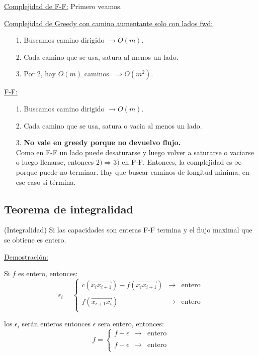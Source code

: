 \documentclass[12pt,a4paper]{article}
\begin{document}
\underline{Complejidad de F-F:} Primero veamos.
\medskip

\underline{Complejidad de Greedy con camino aumentante solo con lados fwd:}
\begin{itemize}
    \item [1.] Buscamos camino dirigido $\to O(m)$.
    \item [2.] Cada camino que se usa, satura al menos un lado.
    \item [3.] Por 2, hay $O(m)$ caminos. $\Rightarrow O(m^{2})$.
\end{itemize}

\underline{F-F:}
\begin{itemize}
    \item [1.] Buscamos camino dirigido $\to O(m)$.
    \item [2.] Cada camino que se usa, satura o vacia al menos un lado.
    \item [3.] \textbf{No vale en greedy porque no devuelvo flujo.}\\
        Como en F-F un lado puede desaturarse y luego volver a saturarse o vaciarse 
        o luego llenarse, entonces $2) \Rightarrow 3)$ en F-F. Entonces, la complejidad 
        es $\infty$ porque puede no terminar. Hay que buscar caminos de longitud 
        minima, en ese caso si términa.
\end{itemize}

\subsection{Teorema de integralidad}
\begin{teorema} (Integralidad) Si las capacidades son enteras F-F termina y el 
    flujo maximal que se obtiene es entero.
\end{teorema}

\underline{Demostración:}
\medskip

Si $f$ es entero, entonces:
$$\epsilon_{i}= \left\{ \begin{array}{lcc}
    c(\overrightarrow{x_{i}x_{i+1}}) - f(\overrightarrow{x_{i}x_{i+1}}) & \to & \text{entero} \\
    \\ f(\overrightarrow{x_{i+1}x_{i}})& \to & \text{entero}\\
    \end{array}
    \right.$$

los $\epsilon_{i}$ serán enteros entonces $\epsilon$ sera entero, entonces:
$$f= \left\{ \begin{array}{lcc}
    f+\epsilon & \to & \text{entero} \\
    \\ f-\epsilon& \to & \text{entero}\\
    \end{array}
    \right.$$
\end{document}
